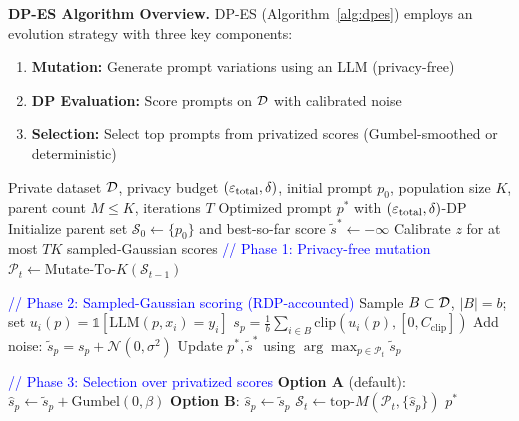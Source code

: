 \vspace{-0.5em}
\noindent\textbf{DP-ES Algorithm Overview.}
DP-ES (Algorithm~\ref{alg:dpes}) employs an evolution strategy with three key components:

\begin{enumerate}
    \vspace{-0.8em}
    \item \textbf{Mutation:} Generate prompt variations using an LLM (privacy-free)
    \vspace{-0.8em}
    \item \textbf{DP Evaluation:} Score prompts on $\mathcal{D}$ with calibrated noise
     \vspace{-0.8em}
    \item \textbf{Selection:} Select top prompts from privatized scores (Gumbel-smoothed or deterministic)
\end{enumerate}

\begin{nolinenumbers}
\begin{algorithm}[t]
\caption{DP-ES: Differentially Private Evolution Strategies}
\label{alg:dpes}
\small
\begin{algorithmic}[1]
\REQUIRE Private dataset $\mathcal{D}$, privacy budget $(\varepsilon_{\text{total}}, \delta)$, initial prompt $p_0$, population size $K$, parent count $M\leq K$, iterations $T$
\ENSURE Optimized prompt $p^*$ with $(\varepsilon_{\text{total}}, \delta)$-DP
\STATE Initialize parent set $\mathcal{S}_0 \leftarrow \{p_0\}$ and best-so-far score $\tilde{s}^{*}\leftarrow-\infty$
\STATE Calibrate $z$ for at most $T K$ sampled-Gaussian scores 
    \STATE \textcolor{blue}{// Phase 1: Privacy-free mutation}
    \STATE $\mathcal{P}_t \leftarrow \text{Mutate-To-}K(\mathcal{S}_{t-1})$ 

    \STATE \textcolor{blue}{// Phase 2: Sampled-Gaussian scoring (RDP-accounted)}
        \STATE Sample $B\subset\mathcal{D}$, $|B|=b$; set $u_i(p)=\mathbb{1}[\text{LLM}(p,x_i)=y_i]$
        \STATE $s_p = \frac{1}{b}\sum_{i\in B}\text{clip}(u_i(p),[0,C_{\text{clip}}])$ 
        \STATE Add noise: $\tilde{s}_p = s_p + \mathcal{N}(0, \sigma^2)$ 
    \ENDFOR
    \STATE Update $p^*,\tilde{s}^*$ using $\arg\max_{p\in\mathcal{P}_t}\tilde{s}_p$ 

    \STATE \textcolor{blue}{// Phase 3: Selection over privatized scores}
    \STATE \textbf{Option A} (default): $\hat{s}_p \leftarrow \tilde{s}_p + \text{Gumbel}(0,\beta)$  
    \STATE \textbf{Option B}: $\hat{s}_p \leftarrow \tilde{s}_p$ 
    \STATE $\mathcal{S}_t \leftarrow \text{top-}M(\mathcal{P}_t, \{\hat{s}_p\})$ 
\ENDFOR
\RETURN $p^*$
\end{algorithmic}
\end{algorithm}
\end{nolinenumbers}

